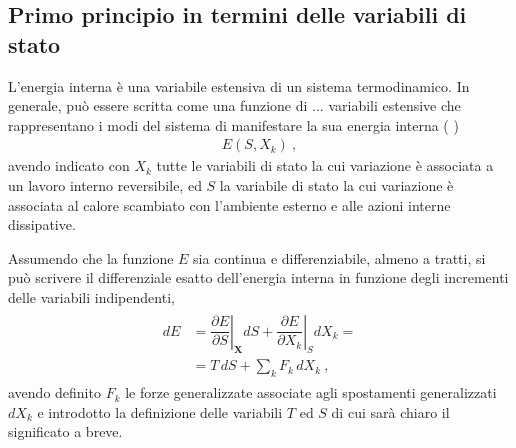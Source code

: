 \documentclass[letterpaper,10pt,italian]{jupyterBook}
\begin{document}
\subsection{Primo principio in termini delle variabili di stato}
\label{\detokenize{ch/thermodynamics/principles-gibbs-phase-rule:primo-principio-in-termini-delle-variabili-di-stato}}\label{\detokenize{ch/thermodynamics/principles-gibbs-phase-rule:physics-hs-thermodynamics-foundation-principles-gibbs-phase-rule-first}}
\sphinxAtStartPar
L’energia interna è una variabile estensiva di un sistema termodinamico. In generale, può essere scritta come una funzione di \(...\) variabili estensive che rappresentano i modi del sistema di manifestare la sua energia interna ( )
\begin{equation*}
\begin{split}E(S, X_k) \ ,\end{split}
\end{equation*}
\sphinxAtStartPar
avendo indicato con \(X_k\) tutte le variabili di stato la cui variazione è associata a un lavoro interno reversibile, ed \(S\) la variabile di stato la cui variazione è associata al calore scambiato con l’ambiente esterno e alle azioni interne dissipative.   

\sphinxAtStartPar
Assumendo che la funzione \(E\) sia continua e differenziabile, almeno a tratti, si può scrivere il differenziale \sphinxhyphen{} esatto \sphinxhyphen{} dell’energia interna in funzione degli incrementi delle variabili indipendenti,
\begin{equation*}
\begin{split}\begin{aligned}
dE & = \left. \dfrac{\partial E}{\partial S} \right|_{\mathbf{X}} d S 
     + \left. \dfrac{\partial E}{\partial X_k} \right|_{S} d X_k  = \\
   & = T \, d S + \sum_k F_k \, d X_k \ ,
\end{aligned}\end{split}
\end{equation*}
\sphinxAtStartPar
avendo definito \(F_k\) le forze generalizzate associate agli spostamenti generalizzati \(dX_k\) e introdotto la definizione delle variabili \(T\) ed \(S\) di cui sarà chiaro il significato a breve.
\end{document}
